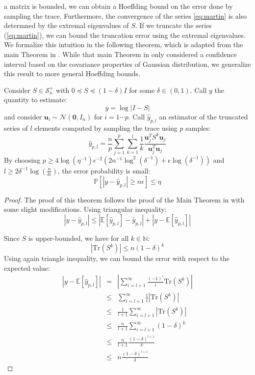 a matrix is bounded, we can obtain a Hoeffding bound on the error
done by sampling the trace. Furthermore, the convergence of the series
\ref{eq:martin} is also determned by the extremal eigenvalues of
$S$. If we truncate the series (\ref{eq:martin}), we can bound the
truncation error using the extremal eigenvalues. We formalize this
intuition in the following theorem, which is adapted from the main
Theorem in \cite{Barry1999}. While that main Theorem in \cite{Barry1999}
only considered a confidence interval based on the covariance properties
of Gaussian distribution, we generalize this result to more general
Hoeffding bounds. \begin{theorem} \label{thm:det-sampling-theorem}Consider
$S\in\mathcal{S}_{n}^{+}$ with $0\preceq S\preceq\left(1-\delta\right)I$
for some $\delta\in\left(0,1\right)$. Call $y$ the quantity to estimate:
\[
y=\log\left|I-S\right|
\]
and consider $\mathbf{u}_{i}\sim\mathcal{N}\left(\mathbf{0},I_{n}\right)$
for $i=1\cdots p$. Call $\hat{y}_{p,l}$ an estimator of the truncated
series of $l$ elements computed by sampling the trace using $p$
samples: 
\[
\hat{y}_{p,l}=\frac{n}{p}\sum_{j=1}^{p}\sum_{k=1}^{l}\frac{1}{k}\frac{\mathbf{u}_{j}^{T}S^{k}\mathbf{u}_{j}}{\mathbf{u}_{j}^{T}\mathbf{u}_{j}}
\]
By choosing $p\geq4\log\left(\eta^{-1}\right)\epsilon^{-2}\left(2n^{-1}\log^{2}\left(\delta^{-1}\right)+\epsilon\log\left(\delta^{-1}\right)\right)$
and $l\geq2\delta^{-1}\log\left(\frac{n}{\delta\epsilon}\right)$,
the error probability is small: 
\[
\mathbb{P}\left[\left|y-\hat{y}_{p,l}\right|\geq n\epsilon\right]\leq\eta
\]
\end{theorem} \begin{proof} The proof of this theorem follows the
proof of the Main Theorem in \cite{Barry1999} with some slight modifications.
Using triangular inequality: 
\[
\left|y-\hat{y}_{p,l}\right|\leq\left|\mathbb{E}\left[\hat{y}_{p,l}\right]-\hat{y}_{p,l}\right|+\left|y-\mathbb{E}\left[\hat{y}_{p,l}\right]\right|
\]


Since $S$ is upper-bounded, we have for all $k\in\mathbb{N}$: 
\[
\left|\mbox{Tr}\left(S^{k}\right)\right|\leq n\left(1-\delta\right)^{k}
\]
Using again triangle inequality, we can bound the error with respect
to the expected value: 
\begin{eqnarray*}
\left|y-\mathbb{E}\left[\hat{y}_{p,l}\right]\right| & = & \left|\sum_{i=l+1}^{\infty}\frac{\left(-1\right)^{i}}{i}\mbox{Tr}\left(S^{k}\right)\right|\\
 & \leq & \sum_{i=l+1}^{\infty}\frac{1}{i}\left|\mbox{Tr}\left(S^{k}\right)\right|\\
 & \leq & \frac{1}{l+1}\sum_{i=l+1}^{\infty}\left|\mbox{Tr}\left(S^{k}\right)\right|\\
 & \leq & \frac{n}{l+1}\sum_{i=l+1}^{\infty}\left(1-\delta\right)^{k}\\
 & \leq & \frac{n}{l+1}\frac{\left(1-\delta\right)^{l+1}}{\delta}\\
 & \leq & n\frac{\left(1-\delta\right)^{l+1}}{\delta}
\end{eqnarray*}



\end{proof}
